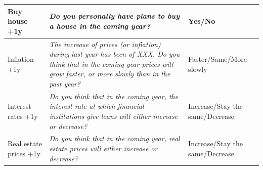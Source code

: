 \documentclass[12pt]{article}
\begin{document}
\begin{table}[]
\begin{tabular}{  | p{5cm} | p{5cm} | p{5cm} |}
\multicolumn{1}{|p{4cm}|}{Buy house +1y}       & \multicolumn{1}{p{8cm}|}{\emph{Do you personally have plans to buy a house in the coming year?}}  & \multicolumn{1}{p{3cm}|}{Yes/No}           \\ \hline
\multicolumn{1}{|p{4cm}|}{Inflation +1y}       & \multicolumn{1}{p{8cm}|}{\emph{The increase of prices (or inflation) during last year has been of XXX. Do you think that in the coming year prices will grow faster, or more slowly than in the past year?}}  & \multicolumn{1}{p{3cm}|}{Faster/Same/More slowly}           \\ \hline
\multicolumn{1}{|p{4cm}|}{Interest rates +1y}       & \multicolumn{1}{p{8cm}|}{\emph{Do you think that in the coming year,  the interest rate at which financial institutions give loans will either increase or decrease?}}  & \multicolumn{1}{p{3cm}|}{Increase/Stay the same/Decrease}           \\ \hline
\multicolumn{1}{|p{4cm}|}{Real estate prices +1y}       & \multicolumn{1}{p{8cm}|}{\emph{Do you think that in the coming year,  real estate prices will either increase or decrease?}}  & \multicolumn{1}{p{3cm}|}{Increase/Stay the same/Decrease}           \\ \hline
\end{tabular}
\end{table}
\end{document}
